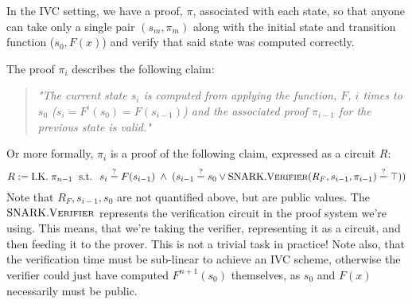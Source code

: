 \documentclass[
]{article}
\let\origfigure\figure
\let\endorigfigure\endfigure
\renewenvironment{figure}[1][2] {
    \expandafter\origfigure\expandafter[H]
} {
    \endorigfigure
}
\newcommand*\Pc{\mathcal{P}}
\newcommand*\meq{\stackrel{?}{=}}
\renewcommand{\vec}[1]{ \boldsymbol{#1} }
\newcommand*{\Prover}{\mathrm{\text{P\scriptsize ROVER}}}
\newcommand*{\Verifier}{\mathrm{\text{V\scriptsize ERIFIER}}}
\newcommand*{\SNARKProver}{\mathrm{\text{SNARK}}.\Prover}
\newcommand*{\SNARKVerifier}{\mathrm{\text{SNARK}}.\Verifier}
\begin{document}
In the IVC setting, we have a proof, \(\pi\), associated with each
state, so that anyone can take only a single pair \((s_m, \pi_m)\) along
with the initial state and transition function (\(s_0, F(x)\)) and
verify that said state was computed correctly.

\begin{figure}[!H]
\centering
{}
\caption{
  A visualization of the relationship between $F, \vec{s}$ and $\vec{\pi}$
  in an IVC setting using traditional SNARKs. $\Pc(s_i, \pi_i)$ denotes
  $\SNARKProver(R_F, s_{i-1}, \pi_{i-1}) = (s_i, \pi_i)$ where $R_F$ is the
  transition function $F$ expressed as a circuit.
}
\end{figure}

The proof \(\pi_i\) describes the following claim:

\begin{quote}
\color{GbGrey}

\textit{"The current state $s_i$ is computed from applying the function,
$F$, $i$ times to $s_0$ ($s_i = F^i(s_0) = F(s_{i-1})$) and the associated
proof $\pi_{i-1}$ for the previous state is valid."}

\end{quote}

Or more formally, \(\pi_i\) is a proof of the following claim, expressed
as a circuit \(R\):
\[R := \text{I.K.} \; \pi_{n-1} \; \text{ s.t. } \; s_i \meq F(s_{i-1}) \; \land \; (s_{i-1} \meq s_0 \lor \SNARKVerifier(R_F, s_{i-1}, \pi_{i-1}) \meq \top))\]
Note that \(R_F, s_{i-1}, s_0\) are not quantified above, but are public
values. The \(\SNARKVerifier\) represents the verification circuit in
the proof system we're using. This means, that we're taking the
verifier, representing it as a circuit, and then feeding it to the
prover. This is not a trivial task in practice! Note also, that the
verification time must be sub-linear to achieve an IVC scheme, otherwise
the verifier could just have computed \(F^{n+1}(s_0)\) themselves, as
\(s_0\) and \(F(x)\) necessarily must be public.
\end{document}
